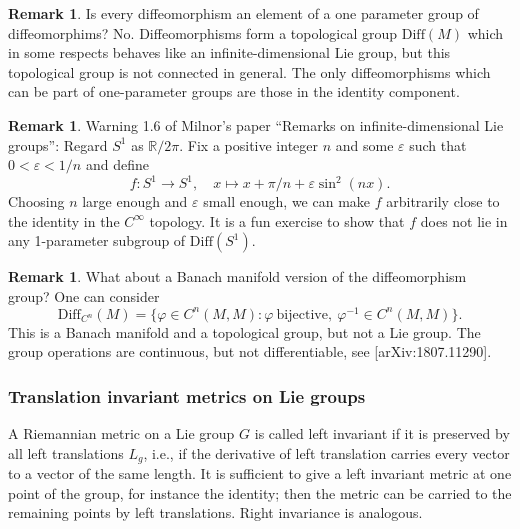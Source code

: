 \documentclass{article}
\theoremstyle{plain}
\theoremstyle{definition}
\newtheorem{oss}[teo]{Remark}
\newcommand{\R}{\ensuremath{\mathbb{R}}}
\newcommand{\Diff}{\ensuremath{\mathrm{Diff}}}
\newcommand{\mf}{\ensuremath{\mathfrak}}
\begin{document}
\begin{oss}
	Is every diffeomorphism an element of a one parameter group of diffeomorphims? No. Diffeomorphisms form a topological group $\Diff(M)$ which in some respects behaves like an infinite-dimensional Lie group, but this topological group is not connected in general. The only diffeomorphisms which can be part of one-parameter groups are those in the identity component.
\end{oss}

\begin{oss}
	Warning 1.6 of Milnor's paper ``Remarks on infinite-dimensional Lie groups'': Regard $S^1$ as $\R/2\pi$. Fix a positive integer $n$ and some $\varepsilon$ such that $0<\varepsilon<1/n$ and define
	\[
	f: S^1\to S^1,\quad x\mapsto x+\pi/n+\varepsilon\sin^2(nx).
	\]
	Choosing $n$ large enough and $\varepsilon$ small enough, we can make $f$ arbitrarily close to the identity in the $C^\infty$ topology. It is a fun exercise to show that $f$ does not lie in any 1-parameter subgroup of $\Diff(S^1)$.
\end{oss}

\begin{oss}
	 What about a Banach manifold version of the diffeomorphism group? One can consider
	 \[
	 \Diff_{C^n}(M)=\{\varphi\in C^n(M,M): \varphi\ \mathrm{bijective},\ \varphi^{-1}\in C^n(M,M)\}.
	 \]
	 This is a Banach manifold and a topological group, but not a Lie group. The group operations are continuous, but not differentiable, see [arXiv:1807.11290].
\end{oss}


\subsubsection{Translation invariant metrics on Lie groups}

A Riemannian metric on a Lie group $G$ is called left invariant if it is preserved
by all left translations $L_g$, i.e., if the derivative of left translation carries every
vector to a vector of the same length. It is sufficient to give a left invariant metric at one point of the group, for instance the identity; then the metric can be carried to the remaining points by left translations. Right invariance is analogous.
%
\end{document}
